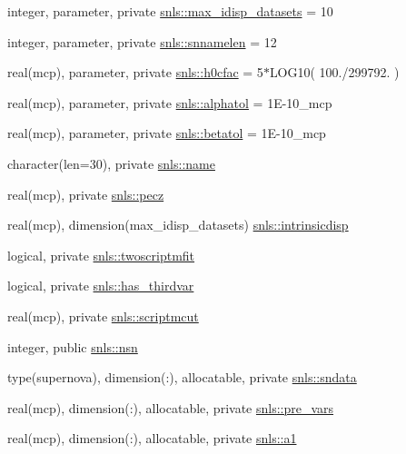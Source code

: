 \begin{DoxyCompactItemize}
\item 
integer, parameter, private \mbox{\hyperlink{namespacesnls_a82d4a9b322c284cf9bba27e6c86cb4f9}{snls\+::max\+\_\+idisp\+\_\+datasets}} = 10
\item 
integer, parameter, private \mbox{\hyperlink{namespacesnls_a0985d8ccb89aafea09ab6de4c78c5600}{snls\+::snnamelen}} = 12
\item 
real(mcp), parameter, private \mbox{\hyperlink{namespacesnls_ae1879f7b41dc92841a8396c15ed20751}{snls\+::h0cfac}} = 5$\ast$L\+O\+G10( 100./299792. )
\item 
real(mcp), parameter, private \mbox{\hyperlink{namespacesnls_a0788c80251a81d3072f95cb12143388d}{snls\+::alphatol}} = 1\+E-\/10\+\_\+mcp
\item 
real(mcp), parameter, private \mbox{\hyperlink{namespacesnls_a2e0b3cead11bfcbc6a35da642d41c977}{snls\+::betatol}} = 1\+E-\/10\+\_\+mcp
\item 
character(len=30), private \mbox{\hyperlink{namespacesnls_a33bba3eb52cb06fe4ca4b1beb737c7f4}{snls\+::name}}
\item 
real(mcp), private \mbox{\hyperlink{namespacesnls_a01a9c6e8b04129b6a2c1b9bbd4cd6cc9}{snls\+::pecz}}
\item 
real(mcp), dimension(max\+\_\+idisp\+\_\+datasets) \mbox{\hyperlink{namespacesnls_aea5409adea753b625ccfc1d60e5705d5}{snls\+::intrinsicdisp}}
\item 
logical, private \mbox{\hyperlink{namespacesnls_aa5648511eb2e907f92a3a833acaafd98}{snls\+::twoscriptmfit}}
\item 
logical, private \mbox{\hyperlink{namespacesnls_a62af67a93e31f94478aa58343fe5c04d}{snls\+::has\+\_\+thirdvar}}
\item 
real(mcp), private \mbox{\hyperlink{namespacesnls_ac747536aeed92aaeab54e9366afeefd2}{snls\+::scriptmcut}}
\item 
integer, public \mbox{\hyperlink{namespacesnls_abc05ea854fb8f639d617703ff33dcf41}{snls\+::nsn}}
\item 
type(supernova), dimension(\+:), allocatable, private \mbox{\hyperlink{namespacesnls_ad60f7a857849e3df34947a9a90a53f38}{snls\+::sndata}}
\item 
real(mcp), dimension(\+:), allocatable, private \mbox{\hyperlink{namespacesnls_a3a2029fb54b5f14f48f328a2b9cf9d98}{snls\+::pre\+\_\+vars}}
\item 
real(mcp), dimension(\+:), allocatable, private \mbox{\hyperlink{namespacesnls_a7a5b5ef85de03b3345f24e542dccf2fe}{snls\+::a1}}
\item 

\end{DoxyCompactItemize}
